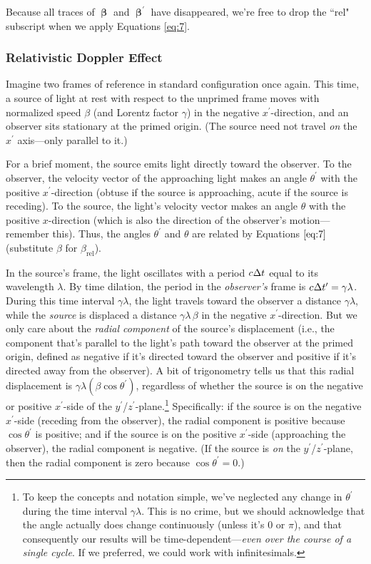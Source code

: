 \documentclass[12pt]{article}
\newcommand{\vvbeta}{\bm{\upbeta}}
\begin{document}
Because all traces of $\vvbeta$ and $\vvbeta^{\prime}$ have disappeared, we're free to drop the ``rel" subscript when we apply Equations \ref{eq:7}.


\subsubsection{Relativistic Doppler Effect}\label{sssec:rdf}
Imagine two frames of reference in standard configuration once again. This time, a source of light at rest with respect to the unprimed frame moves with normalized speed $\beta$ (and Lorentz factor $\gamma$) in the negative $x^\prime$-direction, and an observer sits stationary at the primed origin. (The source need not travel \emph{on} the $x^\prime$ axis---only parallel to it.)

For a brief moment, the source emits light directly toward the observer. To the observer, the velocity vector of the approaching light makes an angle $\theta^\prime$ with the positive $x^\prime$-direction (obtuse if the source is approaching, acute if the source is receding). To the source, the light's velocity vector makes an angle $\theta$ with the positive $x$-direction (which is also the direction of the observer's motion---remember this). Thus, the angles $\theta^\prime$ and $\theta$ are related by Equations $\ref{eq:7}$ (substitute $\beta$ for $\beta_{\textrm{rel}}$).

In the source's frame, the light oscillates with a period $c \mkern.5mu \Delta t$ equal to its wavelength $\lambda$. By time dilation, the period in the \emph{observer's} frame is $c \mkern.5mu \Delta t^\prime = \gamma \lambda$. During this time interval $\gamma \lambda$, the light travels toward the observer a distance $\gamma \lambda$, while the \emph{source} is displaced a distance $\gamma \lambda \, \beta$ in the negative $x^\prime$-direction. But we only care about the \emph{radial component} of the source's displacement (i.e., the component that's parallel to the light's path toward the observer at the primed origin, defined as negative if it's directed toward the observer and positive if it's directed away from the observer). A bit of trigonometry tells us that this radial displacement is $\gamma \lambda (\beta \cos \theta^\prime)$, regardless of whether the source is on the negative or positive $x^\prime$-side of the $y^\prime$/$z^\prime$-plane.\footnote{To keep the concepts and notation simple, we've neglected any change in $\theta^\prime$ during the time interval $\gamma \lambda$. This is no crime, but we should acknowledge that the angle actually does change continuously (unless it's $0$ or $\pi$), and that consequently our results will be time-dependent---\emph{even over the course of a single cycle}. If we preferred, we could work with infinitesimals.} Specifically: if the source is on the negative $x^\prime$-side (receding from the observer), the radial component is positive because $\cos \theta^\prime$ is positive; and if the source is on the positive $x^\prime$-side (approaching the observer), the radial component is negative. (If the source is \emph{on} the $y^\prime$/$z^\prime$-plane, then the radial component is zero because $\cos \theta^\prime = 0$.)
\end{document}
